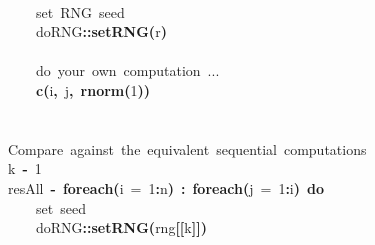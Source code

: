 \documentclass[a4paper,12pt]{article}\usepackage{graphicx, color}
\makeatletter
\newcommand{\hlnumber}[1]{\textcolor[rgb]{0,0,0}{#1}}%
\newcommand{\hlfunctioncall}[1]{\textcolor[rgb]{0.501960784313725,0,0.329411764705882}{\textbf{#1}}}%
\newcommand{\hlkeyword}[1]{\textcolor[rgb]{0,0,0}{\textbf{#1}}}%
\newcommand{\hlargument}[1]{\textcolor[rgb]{0.690196078431373,0.250980392156863,0.0196078431372549}{#1}}%
\newcommand{\hlcomment}[1]{\textcolor[rgb]{0.180392156862745,0.6,0.341176470588235}{#1}}%
\newcommand{\hlassignement}[1]{\textcolor[rgb]{0,0,0}{\textbf{#1}}}%
\newcommand{\hlpackage}[1]{\textcolor[rgb]{0.588235294117647,0.709803921568627,0.145098039215686}{#1}}%
\newcommand{\hlsymbol}[1]{\textcolor[rgb]{0,0,0}{#1}}%
\newcommand{\hlstd}[1]{\textcolor[rgb]{0,0,0}{#1}}%
\newenvironment{kframe}{%
 \def\FrameCommand##1{\hskip\@totalleftmargin \hskip-\fboxsep
 \colorbox{shadecolor}{##1}\hskip-\fboxsep
     \hskip-\linewidth \hskip-\@totalleftmargin \hskip\columnwidth}%
 \MakeFramed {\advance\hsize-\width
   \@totalleftmargin\z@ \linewidth\hsize
   \@setminipage}}%
 {\par\unskip\endMakeFramed}
\newenvironment{knitrout}{}{} %
\renewenvironment{knitrout}{\begin{footnotesize}}{\end{footnotesize}}
\makeatother
\begin{document}
\begin{knitrout}
\begin{kframe}
\begin{flushleft}
\hlstd{}\hspace*{\fill}\\
\hlstd{}{\ }{\ }{\ }{\ }\hlcomment{\usebox{\hlnormalsizeboxhash}{\ }set{\ }RNG{\ }seed}\hspace*{\fill}\\
\hlstd{}{\ }{\ }{\ }{\ }\hlpackage{doRNG}\hlkeyword{::}\hlfunctioncall{setRNG}\hlkeyword{(}\hlsymbol{r}\hlkeyword{)}\hspace*{\fill}\\
\hlstd{}\hspace*{\fill}\\
\hlstd{}{\ }{\ }{\ }{\ }\hlcomment{\usebox{\hlnormalsizeboxhash}{\ }do{\ }your{\ }own{\ }computation{\ }...}\hspace*{\fill}\\
\hlstd{}{\ }{\ }{\ }{\ }\hlfunctioncall{c}\hlkeyword{(}\hlsymbol{i}\hlkeyword{,}{\ }\hlsymbol{j}\hlkeyword{,}{\ }\hlfunctioncall{rnorm}\hlkeyword{(}\hlnumber{1}\hlkeyword{)}\hlkeyword{)}\hspace*{\fill}\\
\hlstd{}\hlkeyword{\usebox{\hlnormalsizeboxclosebrace}}\hspace*{\fill}\\
\hlstd{}\hspace*{\fill}\\
\hlstd{}\hlcomment{\usebox{\hlnormalsizeboxhash}{\ }Compare{\ }against{\ }the{\ }equivalent{\ }sequential{\ }computations}\hspace*{\fill}\\
\hlstd{}\hlsymbol{k}{\ }\hlassignement{\usebox{\hlnormalsizeboxlessthan}-}{\ }\hlnumber{1}\hspace*{\fill}\\
\hlstd{}\hlsymbol{resAll}{\ }\hlassignement{\usebox{\hlnormalsizeboxlessthan}-}{\ }\hlfunctioncall{foreach}\hlkeyword{(}\hlargument{i}{\ }\hlargument{=}{\ }\hlnumber{1}\hlkeyword{:}\hlsymbol{n}\hlkeyword{)}{\ }\hlkeyword{\usebox{\hlnormalsizeboxpercent}:\usebox{\hlnormalsizeboxpercent}}{\ }\hlfunctioncall{foreach}\hlkeyword{(}\hlargument{j}{\ }\hlargument{=}{\ }\hlnumber{1}\hlkeyword{:}\hlsymbol{i}\hlkeyword{)}{\ }\hlkeyword{\usebox{\hlnormalsizeboxpercent}do\usebox{\hlnormalsizeboxpercent}}{\ }\hlkeyword{\usebox{\hlnormalsizeboxopenbrace}}\hspace*{\fill}\\
\hlstd{}{\ }{\ }{\ }{\ }\hlcomment{\usebox{\hlnormalsizeboxhash}{\ }set{\ }seed}\hspace*{\fill}\\
\hlstd{}{\ }{\ }{\ }{\ }\hlpackage{doRNG}\hlkeyword{::}\hlfunctioncall{setRNG}\hlkeyword{(}\hlsymbol{rng}\hlkeyword{[[}\hlsymbol{k}\hlkeyword{]}\hlkeyword{]}\hlkeyword{)}\hspace*{\fill}\\

\end{flushleft}
\end{kframe}
\end{knitrout}
\end{document}
